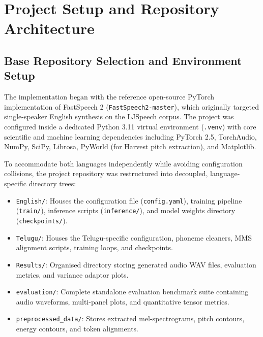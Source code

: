 \documentclass[11pt,a4paper]{article}
\begin{document}
\section{Project Setup and Repository Architecture}

\subsection{Base Repository Selection and Environment Setup}
The implementation began with the reference open-source PyTorch implementation of FastSpeech 2 (\texttt{FastSpeech2-master}), which originally targeted single-speaker English synthesis on the LJSpeech corpus. The project was configured inside a dedicated Python 3.11 virtual environment (\texttt{.venv}) with core scientific and machine learning dependencies including PyTorch 2.5, TorchAudio, NumPy, SciPy, Librosa, PyWorld (for Harvest pitch extraction), and Matplotlib.

To accommodate both languages independently while avoiding configuration collisions, the project repository was restructured into decoupled, language-specific directory trees:
\begin{itemize}
    \item \texttt{English/}: Houses the configuration file (\texttt{config.yaml}), training pipeline (\texttt{train/}), inference scripts (\texttt{inference/}), and model weights directory (\texttt{checkpoints/}).
    \item \texttt{Telugu/}: Houses the Telugu-specific configuration, phoneme cleaners, MMS alignment scripts, training loops, and checkpoints.
    \item \texttt{Results/}: Organised directory storing generated audio WAV files, evaluation metrics, and variance adaptor plots.
    \item \texttt{evaluation/}: Complete standalone evaluation benchmark suite containing audio waveforms, multi-panel plots, and quantitative tensor metrics.
    \item \texttt{preprocessed\_data/}: Stores extracted mel-spectrograms, pitch contours, energy contours, and token alignments.
\end{itemize}
\end{document}
